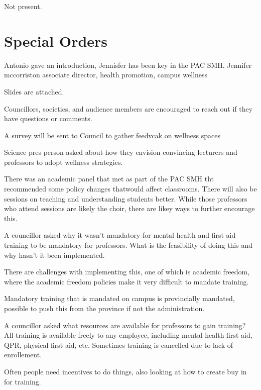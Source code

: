 \begin{information}

    Not present.

\end{information}

\section*{Special Orders}


Antonio gave an introduction, Jennisfer has been key in the PAC SMH.
Jennifer mccorriston
associate director, health promotion, 
campus wellness

Slides are attached.

Councillors, societies, and audience members are encouraged to reach out if
they have questions or comments.

A survey will be sent to Council to gather feedvcak on wellness spaces

Science pres person asked about how they envision convincing lecturers and 
professors to adopt wellness strategies. 

There was an academic panel that met as part of the PAC SMH tht recommended
some policy changes thatwould affect classrooms. There will also be sessions on
teaching and understanding students better. While those professors who attend
sessions are likely the choir, there are likey ways to further encourage this.

A councillor asked why it wasn't mandatory for mental health and first aid
training to be mandatory for professors. What is the feasibility of doing
this and why hasn't it been implemented.

There are challenges with implementing this, one of which is academic freedom,
where the academic freedom policies make it very difficult to mandate training.

Mandatory training that is mandated on campus is provincially mandated,
possible to push this from the province if not the administration.

A councillor asked what resources are available for professors to gain
training? All training is available freely to any employee, including mental 
health first aid, QPR, physical first aid, etc. Sometimes training is cancelled
due to lack of enrollement. 

Often people need incentives to do things, also looking at how to create buy
in for training.

